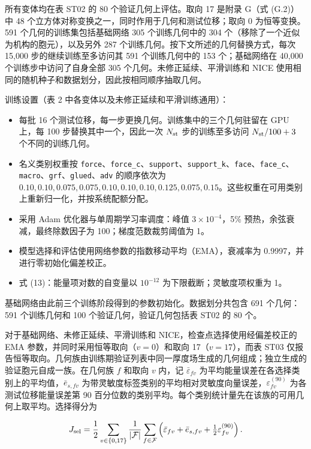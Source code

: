 \documentclass[preprint,12pt,authoryear]{elsarticle}
\providecommand{\tightlist}{\setlength{\itemsep}{0pt}\setlength{\parskip}{0pt}}
\begin{document}
所有变体均在表 ST02 的 80 个验证几何上评估。取向 17 是附录 G（式 (G.2)）中 48 个立方体对称变换之一，同时作用于几何和测试位移；取向 0 为恒等变换。591 个几何的训练集包括基础网络 305 个训练几何中的 304 个（移除了一个近似为机构的胞元），以及另外 287 个训练几何。按下文所述的几何替换方式，每次 15,000 步的继续训练至多访问其 591 个训练几何中的 153 个；基础网络在 40,000 个训练步中访问了自身全部 305 个几何。未修正延续、平滑训练和 NICE 使用相同的随机种子和数据划分，因此按相同顺序抽取几何。

训练设置（表 2 中各变体以及未修正延续和平滑训练通用）：

\begin{itemize}
\tightlist
\item
  每批 16 个测试位移，每一步更换几何。训练集中的三个几何驻留在 GPU 上，每 100 步替换其中一个，因此一次 \(N_{\rm st}\) 步的训练至多访问 \(N_{\rm st}/100+3\) 个不同的训练几何。
\item
  名义类别权重按 \texttt{force}、\texttt{force\_c}、\texttt{support}、\texttt{support\_k}、\texttt{face}、\texttt{face\_c}、\texttt{macro}、\texttt{grf}、\texttt{glued}、\texttt{adv} 的顺序依次为 \(0.10,0.10,0.075,0.075,0.10,0.10,0.10,0.125,0.075,0.15\)。这些权重在可用类别上重新归一化，并按系统配额分配。
\item
  采用 Adam 优化器与单周期学习率调度：峰值 \(3\times10^{-4}\)，5\% 预热，余弦衰减，最终除数因子为 100；梯度范数裁剪阈值为 1。
\item
  模型选择和评估使用网络参数的指数移动平均（EMA），衰减率为 0.9997，并进行零初始化偏差校正。
\item
  式 (13)：能量项对数的自变量以 \(10^{-12}\) 为下限截断；灵敏度项权重为 1。
\end{itemize}

基础网络由此前三个训练阶段得到的参数初始化。数据划分共包含 691 个几何：591 个训练几何和 100 个验证几何，验证几何包括表 ST02 的 80 个。

对于基础网络、未修正延续、平滑训练和 NICE，检查点选择使用经偏差校正的 EMA 参数，并同时采用恒等取向（\(v=0\)）和取向 17（\(v=17\)），而表 ST03 仅报告恒等取向。几何族由训练期验证列表中同一厚度场生成的几何组成；独立生成的验证胞元自成一族。在几何族 \(f\) 和取向 \(v\) 内，记 \(\bar\varepsilon_{fv}\) 为平均能量误差在各选择类别上的平均值，\(\bar e_{s,fv}\) 为带灵敏度标签类别的平均相对灵敏度向量误差，\(\varepsilon^{(90)}_{fv}\) 为各测试位移能量误差第 90 百分位数的类别平均。每个类别统计量先在该族的可用几何上取平均。选择得分为

\[
J_{\rm sel}=\frac12\sum_{v\in\{0,17\}}\frac1{|\mathcal F|}
\sum_{f\in\mathcal F}\left(\bar\varepsilon_{fv}+\bar e_{s,fv}+\tfrac12\varepsilon^{(90)}_{fv}\right).
\]
\end{document}
